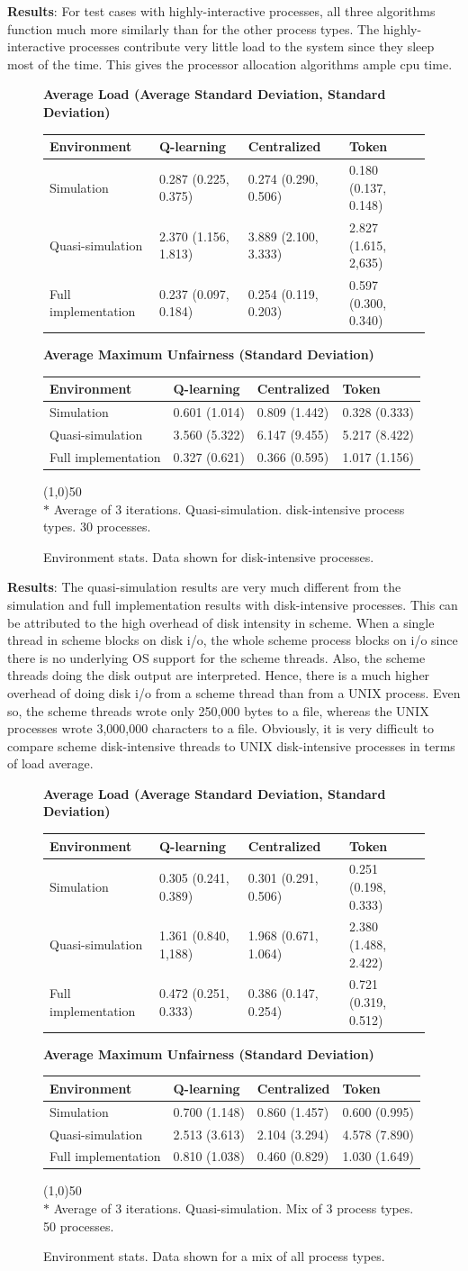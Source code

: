 \documentclass{report}
\newcommand{\envtbl}[6]{
\begin{figure}[H]

\begin{center}
\textbf{#1}
\end{center}

\begin{tabularx}{\linewidth}{|X|X|X|X|} \hline
	\textbf{Environment} & \textbf{Q-learning} & \textbf{Centralized} & \textbf{Token} \\ \hline
	#2
\end{tabularx}

\begin{center}
\textbf{#3}
\end{center}

\begin{tabularx}{\linewidth}{|X|X|X|X|} \hline
	\textbf{Environment} & \textbf{Q-learning} & \textbf{Centralized} & \textbf{Token} \\ \hline
	#4
\end{tabularx}

\vspace{1em}
\line(1,0){50} \\
#5

\caption{#6}
\end{figure}}
\begin{document}
\textbf{Results}: For test cases with highly-interactive processes, all
three algorithms function much more similarly than for the other process
types.  The highly-interactive processes contribute very little load to the
system since they sleep most of the time.  This gives the processor
allocation algorithms ample cpu time.


\envtbl{Average Load (Average Standard Deviation, Standard Deviation)}
{	Simulation  & 0.287 (0.225, 0.375) & 0.274 (0.290, 0.506) & 0.180
(0.137, 0.148)  \\ \hline
	Quasi-simulation  & 2.370 (1.156, 1.813) & 3.889 (2.100, 3.333) &
2.827 (1.615, 2,635) \\ \hline
	Full implementation & 0.237 (0.097, 0.184) & 0.254 (0.119, 0.203) &
0.597 (0.300, 0.340) \\ \hline}
{Average Maximum Unfairness (Standard Deviation)}
{	Simulation  & 0.601 (1.014) & 0.809 (1.442) & 0.328 (0.333)  \\ \hline
	Quasi-simulation  & 3.560 (5.322) & 6.147 (9.455) & 5.217 (8.422) \\ \hline
	Full implementation & 0.327 (0.621) & 0.366 (0.595) & 1.017 (1.156) \\ \hline}
{$*$ Average of 3 iterations.  Quasi-simulation.  disk-intensive process
types.  30 processes.}
{Environment stats.  Data shown for disk-intensive processes.}

\textbf{Results}: The quasi-simulation results are very much different from
the simulation and full implementation results with disk-intensive
processes.  This can be attributed to the high overhead of disk intensity in
scheme.  When a single thread in scheme blocks on disk i/o, the whole scheme
process blocks on i/o since there is no underlying OS support for the scheme
threads.  Also, the scheme threads doing the disk output are interpreted.
Hence, there is a much higher overhead of doing disk i/o from a scheme
thread than from a UNIX process.  Even so, the scheme threads wrote only
250,000 bytes to a file, whereas the UNIX processes wrote 3,000,000
characters to a file.  Obviously, it is very difficult to compare scheme
disk-intensive threads to UNIX disk-intensive processes in terms of load
average.


\envtbl{Average Load (Average Standard Deviation, Standard Deviation)}
{	Simulation  & 0.305 (0.241, 0.389) & 0.301 (0.291, 0.506) & 0.251
(0.198, 0.333)  \\ \hline
	Quasi-simulation  & 1.361 (0.840, 1,188) & 1.968 (0.671, 1.064) &
2.380 (1.488, 2.422) \\ \hline
	Full implementation & 0.472 (0.251, 0.333) & 0.386 (0.147, 0.254) &
0.721 (0.319, 0.512) \\ \hline}
{Average Maximum Unfairness (Standard Deviation)}
{	Simulation  & 0.700 (1.148) & 0.860 (1.457) & 0.600 (0.995)  \\ \hline
	Quasi-simulation  & 2.513 (3.613) & 2.104 (3.294) & 4.578 (7.890) \\ \hline
	Full implementation & 0.810 (1.038) & 0.460 (0.829) & 1.030 (1.649) \\ \hline}
{$*$ Average of 3 iterations.  Quasi-simulation.  Mix of 3 process types.  50
processes.}
{Environment stats.  Data shown for a mix of all process types.}
\end{document}
